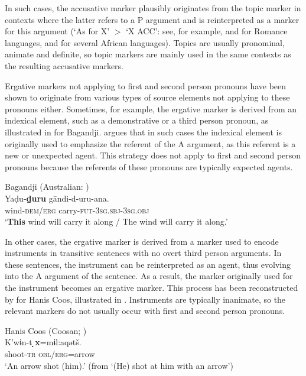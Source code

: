 \documentclass[output=paper]{langsci/langscibook}
\begin{document}
\z
\z

In such cases, the accusative marker
plausibly originates from the topic
marker in contexts where the latter refers to a P argument and  is
reinterpreted as a marker for this argument (`As for X' $>$ `X ACC': see, for example, \citealt{Rohlfs1984} and \citealt{Pensado1995} for Romance
languages, and \citealt{Konig2008} for several African languages). 
Topics are usually pronominal, animate and
definite, so topic markers
are mainly used in the same contexts as the resulting accusative
markers. 

Ergative 
\label{p:cristofaro:ergatives}
markers not applying to first and second person
pronouns have been shown to originate
from various types of source elements not applying to these pronouns
either. Sometimes, for example,  the ergative marker is derived from an indexical
element, such as a demonstrative or a third person pronoun, as
illustrated in  for Bagandji.
\citet{McGregor2006,McGregor2008} argues that in such cases the indexical
element is
originally used to emphasize the referent of the A argument, as this
referent is a new or unexpected agent. This strategy does not
    apply to  first and second person pronouns because the referents
    of these pronouns are typically expected agents.

\ea\label{bagandji}
Bagandji (Australian: )\\
\gll Yaḍu-\textbf{ḏuru} gāndi-d-uru-ana.\\
wind-\textsc{dem/erg} carry-\textsc{fut-3sg.sbj-3sg.obj}\\
\glt `{\bf This} wind will carry it along / The wind will carry it along.' 
 
\z



In other cases, the ergative marker is derived from a marker used to encode instruments
 in  transitive sentences with no overt third person arguments. In these sentences, the
  instrument can be reinterpreted as an agent, thus evolving into the A
  argument of the sentence. As a result,  the
 marker originally used for the instrument becomes an ergative marker. This process has
  been reconstructed by \citet{Mithun2005} for Hanis Coos, illustrated in
  .  Instruments are typically inanimate, so the relevant markers 
do not usually occur with first and second person pronouns.

\ea 
\label{hanis}
Hanis Coos (Coosan; )\\
\gll K'w​ɨn-t \textbf{̣x}=m​ɨl:aqətš.\\
shoot-\textsc{tr} \textsc{obl/erg}=arrow\\
\glt `An arrow shot (him).' (from `(He) shot at him with an arrow')
\end{document}
